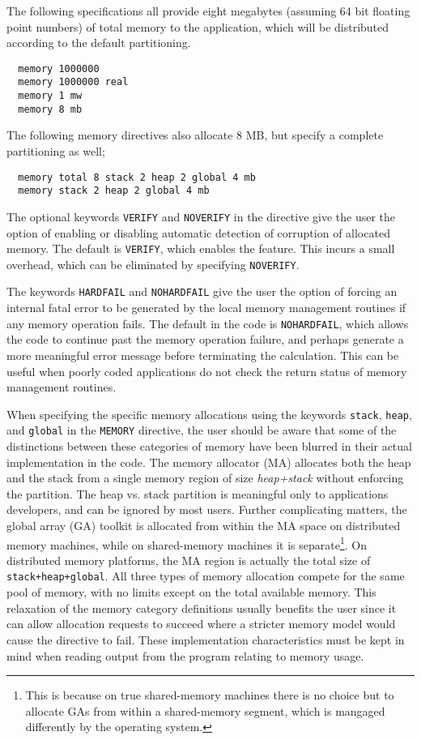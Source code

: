 The following specifications all provide eight megabytes (assuming 64
bit floating point numbers) of total memory to the application, which
will be distributed according to the default partitioning.
\begin{verbatim}
  memory 1000000
  memory 1000000 real
  memory 1 mw
  memory 8 mb
\end{verbatim}

The following memory directives also allocate 8 MB, but specify a complete
partitioning as well;

\begin{verbatim}
  memory total 8 stack 2 heap 2 global 4 mb
  memory stack 2 heap 2 global 4 mb
\end{verbatim}

The optional keywords \verb+VERIFY+ and \verb+NOVERIFY+ in the
directive give the user the option of enabling or disabling automatic
detection of corruption of allocated memory.  The default is
\verb+VERIFY+, which enables the feature. This incurs a small
overhead, which can be eliminated by specifying \verb+NOVERIFY+.

The keywords \verb+HARDFAIL+ and \verb+NOHARDFAIL+ give the user the
option of forcing an internal fatal error to be generated by the local
memory management routines if any memory operation fails.  The default
in the code is \verb+NOHARDFAIL+, which allows the code to continue
past the memory operation failure, and perhaps generate a more
meaningful error message before terminating the calculation.  This can
be useful when poorly coded applications do not check the return
status of memory management routines.

When specifying the specific memory allocations using the keywords
\verb+stack+, \verb+heap+, and \verb+global+ in the \verb+MEMORY+
directive, the user should be aware that some of the distinctions
between these categories of memory have been blurred in their actual
implementation in the code.  The memory allocator (MA) allocates both
the heap and the stack from a single memory region of size {\em
  heap+stack} without enforcing the partition.  The heap vs. stack
partition is meaningful only to applications developers, and can be
ignored by most users.  Further complicating matters, the global array
(GA) toolkit is allocated from within the MA space on distributed
memory machines, while on shared-memory machines it is
separate\footnote{This is because on true shared-memory machines there
  is no choice but to allocate GAs from within a shared-memory
  segment, which is mangaged differently by the operating system.}.
On distributed memory platforms, the MA region is actually the total
size of {\tt stack+heap+global}.  All three types of memory allocation
compete for the same pool of memory, with no limits except on the
total available memory.  This relaxation of the memory category
definitions usually benefits the user since it can allow allocation
requests to succeed where a stricter memory model would cause the
directive to fail.  These implementation characteristics must be kept
in mind when reading output from the program relating to memory usage.

